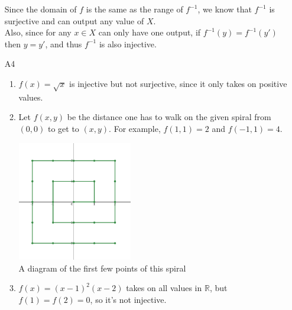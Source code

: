 \documentclass[12pt]{article}
\begin{document}
\begin{itemize}
        Since the domain of $f$ is the same as the range of $f^{-1}$, we know that $f^{-1}$ is surjective and can output any value of $X$. \\
        Also, since for any $x \in X$ can only have one output, if $f^{-1}(y)=f^{-1}(y')$ then $y=y'$, and thus $f^{-1}$ is also injective.
    \item[A4] \begin{enumerate}[label=\alph*]
            \item $f(x)=\sqrt{x}$ is injective but not surjective, since it only takes on positive values.
            \item Let $f(x, y)$ be the distance one has to walk on the given spiral from $(0, 0)$ to get to $(x, y)$.
                  For example, $f(1, 1)=2$ and $f(-1, 1)=4$.
                  \begin{center}
                      \includegraphics[width=5cm]{img/spiral} \\
                      \small{A diagram of the first few points of this spiral}
                  \end{center}
            \item $f(x)=(x-1)^2(x-2)$ takes on all values in $\mathbb{R}$, but $f(1)=f(2)=0$, so it's not injective.
        \end{enumerate}
\end{itemize}
\end{document}
